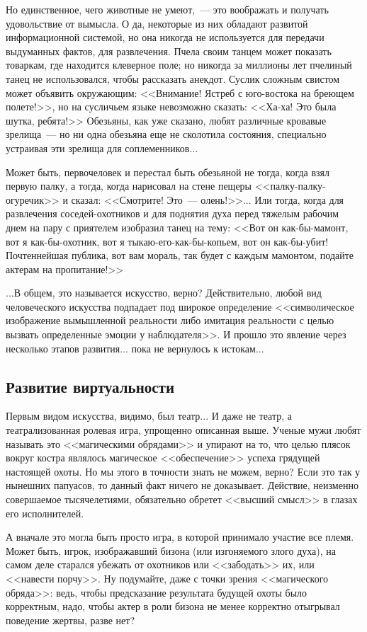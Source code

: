\documentclass{scrbook}
\newcommand{\flqq}{<<}
\newcommand{\frqq}{>>}
\newcommand{\mdash}{~--- }
\newcommand{\commamdash}{~--- } %
\newcommand{\essaysection}[1]{\subsection*{#1}\nopagebreak}
\begin{document}
Но единственное, чего животные не умеют,{\commamdash} это воображать и получать удовольствие от вымысла. О да, некоторые из них обладают развитой информационной системой, но она никогда не используется для передачи выдуманных фактов, для развлечения. Пчела своим танцем может показать товаркам, где находится клеверное поле; но никогда за миллионы лет пчелиный танец не использовался, чтобы рассказать анекдот. Суслик сложным свистом может объявить окружающим: {\flqq}Внимание! Ястреб с юго-востока на бреющем полете!{\frqq}, но на сусличьем языке невозможно сказать: {\flqq}Ха-ха! Это была шутка, ребята!{\frqq} Обезьяны, как уже сказано, любят различные кровавые зрелища{\mdash}но ни одна обезьяна еще не сколотила состояния, специально устраивая эти зрелища для соплеменников...

Может быть, первочеловек и перестал быть обезьяной не тогда, когда взял первую палку, а тогда, когда нарисовал на стене пещеры {\flqq}палку-палку-огуречик{\frqq} и сказал: {\flqq}Смотрите! Это{\mdash}олень!{\frqq}... Или тогда, когда для развлечения соседей-охотников и для поднятия духа перед тяжелым рабочим днем на пару с приятелем изобразил танец на тему: {\flqq}Вот он как-бы-мамонт, вот я как-бы-охотник, вот я тыкаю-его-как-бы-копьем, вот он как-бы-убит! Почтеннейшая публика, вот вам мораль, так будет с каждым мамонтом, подайте актерам на пропитание!{\frqq}

...В общем, это называется искусство, верно? Действительно, любой вид человеческого искусства подпадает под широкое определение {\flqq}символическое изображение вымышленной реальности либо имитация реальности с целью вызвать определенные эмоции у наблюдателя{\frqq}. И прошло это явление через несколько этапов развития... пока не вернулось к истокам...

\essaysection{Развитие виртуальности}

Первым видом искусства, видимо, был театр... И даже не театр, а театрализованная ролевая игра, упрощенно описанная выше. Ученые мужи любят называть это {\flqq}магическими обрядами{\frqq} и упирают на то, что целью плясок вокруг костра являлось магическое {\flqq}обеспечение{\frqq} успеха грядущей настоящей охоты. Но мы этого в точности знать не можем, верно? Если это так у нынешних папуасов, то данный факт ничего не доказывает. Действие, неизменно совершаемое тысячелетиями, обязательно обретет {\flqq}высший смысл{\frqq} в глазах его исполнителей.

А вначале это могла быть просто игра, в которой принимало участие все племя. Может быть, игрок, изображавший бизона (или изгоняемого злого духа), на самом деле старался убежать от охотников или {\flqq}забодать{\frqq} их, или {\flqq}навести порчу{\frqq}. Ну подумайте, даже с точки зрения {\flqq}магического обряда{\frqq}: ведь, чтобы предсказание результата будущей охоты было корректным, надо, чтобы актер в роли бизона не менее корректно отыгрывал поведение жертвы, разве нет?
\end{document}

